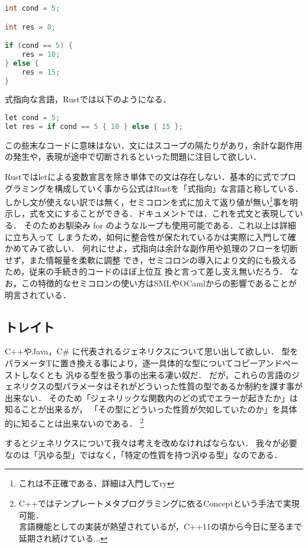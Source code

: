 \begin{lstlisting}[language={C},caption=Cにおけるif文,label=c_if]
int cond = 5;

int res = 0;

if (cond == 5) {
    res = 10;
} else {
    res = 15;
}
\end{lstlisting}
式指向な言語，Rustでは以下のようになる．
\begin{lstlisting}[language={C++},caption=Rustにおけるif式,label=rust_if]
let cond = 5;
let res = if cond == 5 { 10 } else { 15 };
\end{lstlisting}
この些末なコードに意味はない．文にはスコープの隔たりがあり，余計な副作用の発生や，表現が途中で切断されるといった問題に注目して欲しい．

Rustではletによる変数宣言を除き単体での文は存在しない．基本的に式でプログラミングを構成していく事から公式はRustを「式指向」な言語と称している．
しかし文が使えない訳では無く，セミコロンを式に加えて返り値が無い\footnote{これは不正確である．詳細は入門してry}事を明示し，式を文にすることができる．ドキュメントでは．これを式文と表現している．
そのためお馴染み for のようなループも使用可能である．これ以上は詳細に立ち入って
しまうため，如何に整合性が保たれているかは実際に入門して確かめてみて欲しい．
何れにせよ，式指向は余計な副作用や処理のフローを切断せず，また情報量を柔軟に調整
でき，セミコロンの導入により文的にも扱えるため，従来の手続き的コードのほぼ上位互
換と言って差し支え無いだろう．
なお，この特徴的なセミコロンの使い方はSMLやOCamlからの影響であることが明言されている．\cite{inf}

\subsection{トレイト}
C++やJava，C\# に代表されるジェネリクスについて思い出して欲しい．
型をパラメータTに置き換える事により，逐一具体的な型についてコピーアンドペーストしなくとも
汎ゆる型を扱う事の出来る凄い奴だ．
だが，これらの言語のジェネリクスの型パラメータはそれがどういった性質の型であるか制約を課す事が出来ない．
そのため「ジェネリックな関数内のどの式でエラーが起きたか」は知ることが出来るが，
「その型にどういった性質が欠如していたのか」を具体的に知ることは出来ないのである．
\footnote{C++ではテンプレートメタプログラミングに依るConceptという手法で実現可能．
  \\ 言語機能としての実装が熱望されているが，C++11の頃から今日に至るまで延期され続けている...}

するとジェネリクスについて我々は考えを改めなければならない．
我々が必要なのは「汎ゆる型」ではなく，「特定の性質を持つ汎ゆる型」なのである．

